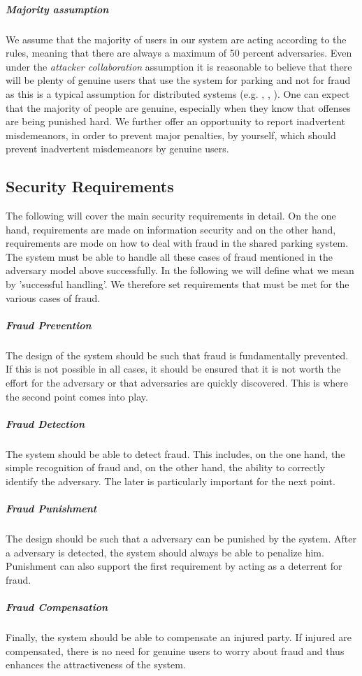 \documentclass[
a4paper,     %
titlepage,   %
14pt         %
]{scrartcl}  %
\theoremstyle{mystyle}
\begin{document}
\subparagraph{Majority assumption} We assume that the majority of users in our system are acting according to the rules, meaning that there are always a maximum of 50 percent adversaries. Even under the \textit{attacker collaboration} assumption it is reasonable to believe that there will be plenty of genuine users that use the system for parking and not for fraud as this is a typical assumption for distributed systems (e.g. \cite{benenson2004secure}, \cite{nojoumian2014efficient}, \cite{avoine2005gracefully}). One can expect that the majority of people are genuine, especially when they know that offenses are being punished hard. We further offer an opportunity to report inadvertent misdemeanors, in order to prevent major penalties, by yourself, which should prevent inadvertent misdemeanors by genuine users.\\

\subsection{Security Requirements}
The following will cover the main security requirements in detail. On the one hand, requirements are made on information security and on the other hand, requirements are mode on how to deal with fraud in the shared parking system. \\

The system must be able to handle all these cases of fraud mentioned in the adversary model above successfully. In the following we will define what we mean by 'successful handling'. We therefore set requirements that must be met for the various cases of fraud.
\subparagraph{Fraud Prevention} The design of the system should be such that fraud is fundamentally prevented. If this is not possible in all cases, it should be ensured that it is not worth the effort for the adversary or that adversaries are quickly discovered. This is where the second point comes into play.
\subparagraph{Fraud Detection} The system should be able to detect fraud. This includes, on the one hand, the simple recognition of fraud and, on the other hand, the ability to correctly identify the adversary. The later is particularly important for the next point.
\subparagraph{Fraud Punishment} The design should be such that a adversary can be punished by the system. After a adversary is detected, the system should always be able to penalize him. Punishment can also support the first requirement by acting as a deterrent for fraud.
\subparagraph{Fraud Compensation} Finally, the system should be able to compensate an injured party. If injured are compensated, there is no need for genuine users to worry about fraud and thus enhances the attractiveness of the system.\\
\end{document}
